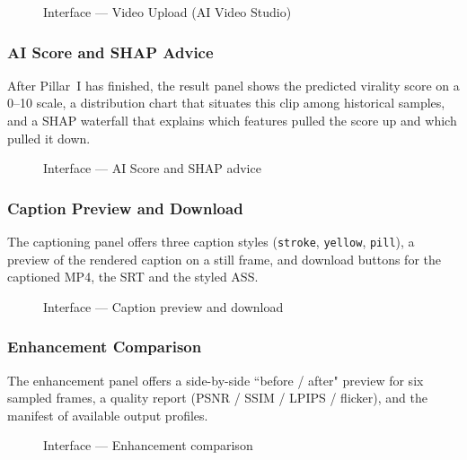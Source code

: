 \begin{figure}[H]
  \centering
  \caption{Interface --- Video Upload (AI Video Studio)}
  \label{fig:ui_upload}
\end{figure}

\subsubsection{AI Score and SHAP Advice}
\label{sec:ui_score}
After Pillar~I has finished, the result panel shows the predicted virality score on a
0--10 scale, a distribution chart that situates this clip among historical samples, and a
SHAP waterfall that explains which features pulled the score up and which pulled it down.

\begin{figure}[H]
  \centering
  \caption{Interface --- AI Score and SHAP advice}
  \label{fig:ui_score}
\end{figure}

\subsubsection{Caption Preview and Download}
\label{sec:ui_captions}
The captioning panel offers three caption styles (\texttt{stroke}, \texttt{yellow},
\texttt{pill}), a preview of the rendered caption on a still frame, and download buttons
for the captioned MP4, the SRT and the styled ASS.

\begin{figure}[H]
  \centering
  \caption{Interface --- Caption preview and download}
  \label{fig:ui_captions}
\end{figure}

\subsubsection{Enhancement Comparison}
\label{sec:ui_enhance}
The enhancement panel offers a side-by-side ``before / after" preview for six sampled
frames, a quality report (PSNR / SSIM / LPIPS / flicker), and the manifest of available
output profiles.

\begin{figure}[H]
  \centering
  \caption{Interface --- Enhancement comparison}
  \label{fig:ui_enhance}
\end{figure}

